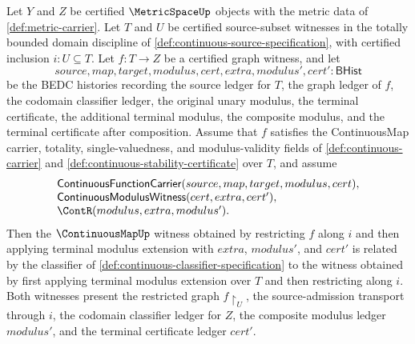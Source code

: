 
\begin{theorem}
\label{thm:uniform-continuity-restriction-terminal-modulus-commutes}
Let $Y$ and $Z$ be certified $\MetricSpaceUp$ objects with the metric data of \autoref{def:metric-carrier}. Let $T$ and $U$ be certified source-subset witnesses in the totally bounded domain discipline of \autoref{def:continuous-source-specification}, with certified inclusion $i:U\subseteq T$. Let $f:T\to Z$ be a certified graph witness, and let
$$
source,map,target,modulus,cert,extra,modulus',cert':\mathsf{BHist}
$$
be the BEDC histories recording the source ledger for $T$, the graph ledger of $f$, the codomain classifier ledger, the original unary modulus, the terminal certificate, the additional terminal modulus, the composite modulus, and the terminal certificate after composition. Assume that $f$ satisfies the ContinuousMap carrier, totality, single-valuedness, and modulus-validity fields of \autoref{def:continuous-carrier} and \autoref{def:continuous-stability-certificate} over $T$, and assume
$$
\begin{array}{l}
\mathsf{ContinuousFunctionCarrier}(source,map,target,modulus,cert),\\
\mathsf{ContinuousModulusWitness}(cert,extra,cert'),\\
\ContR(modulus,extra,modulus').
\end{array}
$$
Then the $\ContinuousMapUp$ witness obtained by restricting $f$ along $i$ and then applying terminal modulus extension with $extra$, $modulus'$, and $cert'$ is related by the classifier of \autoref{def:continuous-classifier-specification} to the witness obtained by first applying terminal modulus extension over $T$ and then restricting along $i$. Both witnesses present the restricted graph $f\!\restriction_U$, the source-admission transport through $i$, the codomain classifier ledger for $Z$, the composite modulus ledger $modulus'$, and the terminal certificate ledger $cert'$.
\end{theorem}
